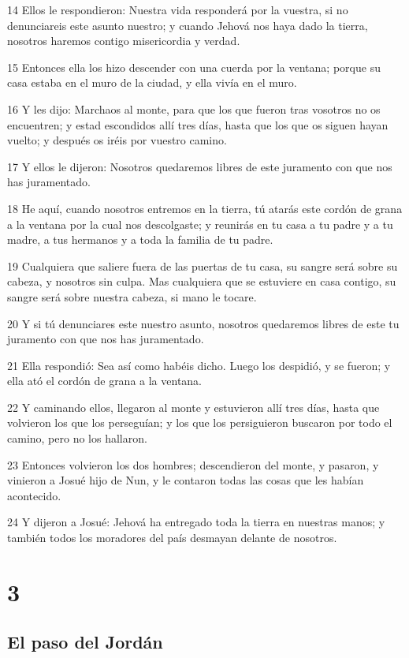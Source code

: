 \par 14 Ellos le respondieron: Nuestra vida responderá por la vuestra, si no denunciareis este asunto nuestro; y cuando Jehová nos haya dado la tierra, nosotros haremos contigo misericordia y verdad.
\par 15 Entonces ella los hizo descender con una cuerda por la ventana; porque su casa estaba en el muro de la ciudad, y ella vivía en el muro.
\par 16 Y les dijo: Marchaos al monte, para que los que fueron tras vosotros no os encuentren; y estad escondidos allí tres días, hasta que los que os siguen hayan vuelto; y después os iréis por vuestro camino.
\par 17 Y ellos le dijeron: Nosotros quedaremos libres de este juramento con que nos has juramentado.
\par 18 He aquí, cuando nosotros entremos en la tierra, tú atarás este cordón de grana a la ventana por la cual nos descolgaste; y reunirás en tu casa a tu padre y a tu madre, a tus hermanos y a toda la familia de tu padre.
\par 19 Cualquiera que saliere fuera de las puertas de tu casa, su sangre será sobre su cabeza, y nosotros sin culpa. Mas cualquiera que se estuviere en casa contigo, su sangre será sobre nuestra cabeza, si mano le tocare.
\par 20 Y si tú denunciares este nuestro asunto, nosotros quedaremos libres de este tu juramento con que nos has juramentado.
\par 21 Ella respondió: Sea así como habéis dicho. Luego los despidió, y se fueron; y ella ató el cordón de grana a la ventana.
\par 22 Y caminando ellos, llegaron al monte y estuvieron allí tres días, hasta que volvieron los que los perseguían; y los que los persiguieron buscaron por todo el camino, pero no los hallaron.
\par 23 Entonces volvieron los dos hombres; descendieron del monte, y pasaron, y vinieron a Josué hijo de Nun, y le contaron todas las cosas que les habían acontecido.
\par 24 Y dijeron a Josué: Jehová ha entregado toda la tierra en nuestras manos; y también todos los moradores del país desmayan delante de nosotros.

\chapter{3}

\section*{El paso del Jordán}

